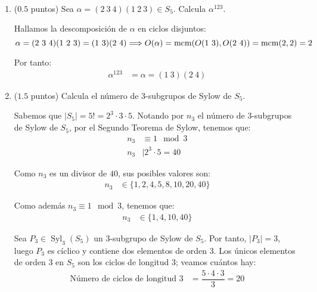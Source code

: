 \documentclass[12pt]{article}
\DeclareMathOperator{\Syl}{Syl}
\begin{document}
    \begin{ejercicio}~
        \begin{enumerate}
            \item ($0.5$ puntos) Sea $\alpha=(2\ 3\ 4)(1\ 2\ 3) \in S_5$. Calcula $\alpha^{123}$.
            
            Hallamos la descomposición de $\alpha$ en ciclos disjuntos:
            \begin{equation*}
                \alpha = (2\ 3\ 4)(1\ 2\ 3) = (1\ 3)(2\ 4)
                \Longrightarrow O(\alpha)=\mcm(O(1\ 3),O(2\ 4)) = \mcm(2,2) = 2
            \end{equation*}

            Por tanto:
            \begin{align*}
                \alpha^{123} & = \alpha = (1\ 3)(2\ 4)
            \end{align*}
            \item ($1.5$ puntos) Calcula el número de $3$-subgrupos de Sylow de $S_5$.
            
            Sabemos que $|S_5|=5!=2^3\cdot 3\cdot 5$. Notando por $n_3$ el número de $3$-subgrupos de Sylow de $S_5$, por el Segundo Teorema de Sylow, tenemos que:
            \begin{align*}
                n_3 & \equiv 1 \mod 3 \\
                n_3 & \mid 2^3\cdot 5=40
            \end{align*}

            Como $n_3$ es un divisor de $40$, sus posibles valores son:
            \begin{align*}
                n_3 & \in \{1,2,4,5,8,10,20,40\}
            \end{align*}

            Como además $n_3 \equiv 1 \mod 3$, tenemos que:
            \begin{align*}
                n_3 & \in \{1,4,10,40\}
            \end{align*}

            Sea $P_3\in \Syl_3(S_5)$ un $3$-subgrupo de Sylow de $S_5$. Por tanto, $|P_3|=3$, luego $P_3$ es cíclico y contiene dos elementos de orden $3$. Los únicos elementos de orden $3$ en $S_5$ son los ciclos de longitud $3$; veamos cuántos hay:
            \begin{align*}
                \text{Número de ciclos de longitud } 3 & = \dfrac{5\cdot 4\cdot 3}{3} = 20
            \end{align*}


\end{enumerate}
\end{ejercicio}
\end{document}
